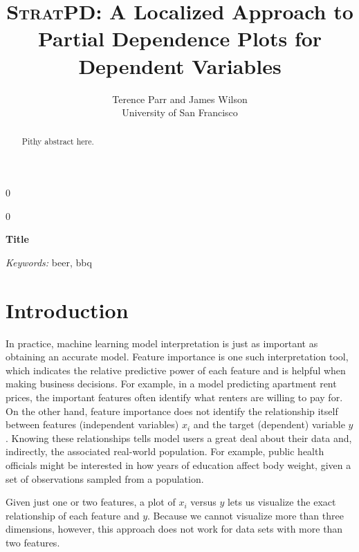\documentclass[12pt]{article}
\newcommand{\blind}{0}
\newcommand{\spd}{\fontfamily{cmr}\textsc{\textbf{StratPD}}}
\begin{document}
\def\spacingset#1{\renewcommand{\baselinestretch}%
{#1}\small\normalsize} \spacingset{1}



\blind
{
  \title{\bf \spd: A Localized Approach to Partial Dependence Plots for Dependent Variables}

  \author{Terence Parr and James Wilson\\
      University of San Francisco\\
}
  \maketitle
} \fi

\blind
{
  \bigskip
  \bigskip
  \bigskip
  \begin{center}
    {\LARGE\bf Title}
\end{center}
  \medskip
} \fi

\bigskip
\begin{abstract}
Pithy abstract here.
\end{abstract}

\noindent%
{\it Keywords:} beer, bbq

\section{Introduction}
\label{sec:intro}

In practice, machine learning model interpretation is just as important as obtaining an accurate model. Feature importance is one such interpretation tool, which indicates the relative predictive power of each feature and is helpful when making business decisions. For example, in a model predicting apartment rent prices, the important features often identify what renters are willing to pay for. On the other hand, feature importance does not identify the relationship itself between features (independent variables) $x_i$ and the target (dependent) variable $y$.  Knowing these relationships tells model users a great deal about their data and, indirectly, the associated real-world population. For example, public health officials might be interested in how years of education affect body weight, given a set of observations sampled from a population.

Given just one or two features, a plot of $x_i$ versus $y$ lets us visualize the exact relationship of each feature and $y$.  Because we cannot visualize more than three dimensions, however, this approach does not work for data sets with more than two features.
\end{document}
